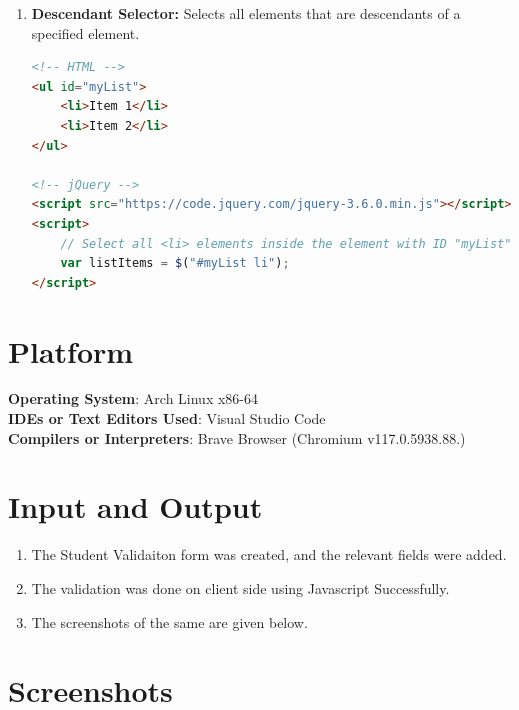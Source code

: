 \documentclass[11pt]{article}
\begin{document}
\begin{enumerate}
    \item \textbf{Descendant Selector:} Selects all elements that are descendants of a specified element.

          \begin{lstlisting}[language=HTML, caption=Example: Descendant Selector]
<!-- HTML -->
<ul id="myList">
    <li>Item 1</li>
    <li>Item 2</li>
</ul>

<!-- jQuery -->
<script src="https://code.jquery.com/jquery-3.6.0.min.js"></script>
<script>
    // Select all <li> elements inside the element with ID "myList"
    var listItems = $("#myList li");
</script>
\end{lstlisting}

\end{enumerate}


\section{Platform}
\textbf{Operating System}: Arch Linux x86-64 \\
\textbf{IDEs or Text Editors Used}: Visual Studio Code\\
\textbf{Compilers or Interpreters}: Brave Browser (Chromium v117.0.5938.88.) \\

\section{Input and Output}

\begin{enumerate}
    \item The Student Validaiton form was created, and the relevant fields were added.
    \item The validation was done on client side using Javascript Successfully.
    \item The screenshots of the same are given below.
\end{enumerate}

\section{Screenshots}
\end{document}
